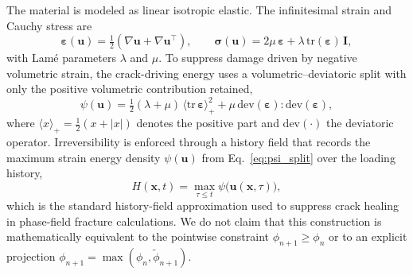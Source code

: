 \documentclass[10pt]{article}
\theoremstyle{definition}
\begin{document}
The material is modeled as linear isotropic elastic. The infinitesimal strain and Cauchy stress are
%
\begin{equation}
    \boldsymbol{\varepsilon}(\mathbf{u}) = \tfrac{1}{2}\!\left(\nabla\mathbf{u} + \nabla\mathbf{u}^{\top}\right),
    \qquad
    \boldsymbol{\sigma}(\mathbf{u}) = 2\mu\,\boldsymbol{\varepsilon} + \lambda\,\mathrm{tr}(\boldsymbol{\varepsilon})\,\mathbf{I},
    \label{eq:constitutive}
\end{equation}
%
with Lam\'e parameters $\lambda$ and $\mu$. To suppress damage driven by negative volumetric strain, the crack-driving energy uses a volumetric--deviatoric split with only the positive volumetric contribution retained,
%
\begin{equation}
    \psi(\mathbf{u}) = \tfrac{1}{2}(\lambda+\mu)\,\langle \mathrm{tr}\,\boldsymbol{\varepsilon}\rangle_{+}^{2}
    + \mu\,\mathrm{dev}(\boldsymbol{\varepsilon})\!:\!\mathrm{dev}(\boldsymbol{\varepsilon}),
    \label{eq:psi_split}
\end{equation}
%
where $\langle x\rangle_{+}=\tfrac{1}{2}(x+|x|)$ denotes the positive part and $\mathrm{dev}(\cdot)$ the deviatoric operator.
%
Irreversibility is enforced through a history field that records the maximum strain energy density $\psi(\mathbf{u})$ from Eq.~\eqref{eq:psi_split} over the loading history,
%
\begin{equation}
    H(\mathbf{x},t) = \max_{\tau \le t} \psi\big(\mathbf{u}(\mathbf{x},\tau)\big),
    \label{eq:history}
\end{equation}
%
which is the standard history-field approximation used to suppress crack healing in phase-field fracture calculations.
%
We do not claim that this construction is mathematically equivalent to the pointwise constraint $\phi_{n+1}\ge\phi_n$ or to an explicit projection $\phi_{n+1}=\max(\phi_n,\widetilde{\phi}_{n+1})$.
\end{document}
